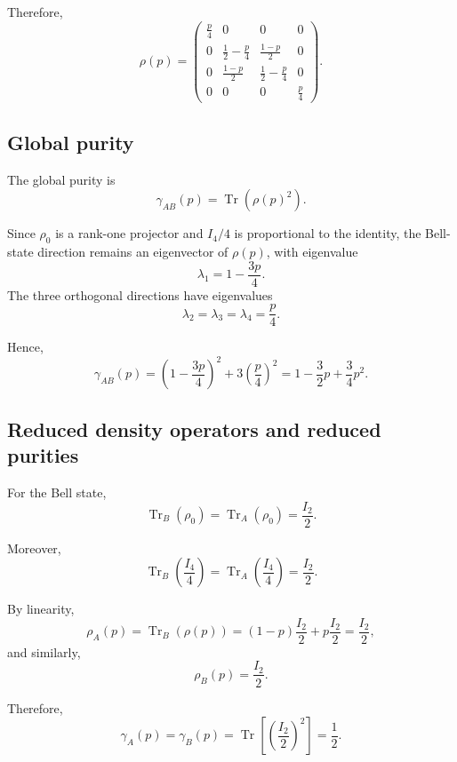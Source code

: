 \documentclass[a4paper]{article}
\begin{document}
Therefore,
\[
\rho(p)
=
\begin{pmatrix}
\frac{p}{4} & 0 & 0 & 0\\
0 & \frac12-\frac{p}{4} & \frac{1-p}{2} & 0\\
0 & \frac{1-p}{2} & \frac12-\frac{p}{4} & 0\\
0 & 0 & 0 & \frac{p}{4}
\end{pmatrix}.
\]


\subsection*{Global purity}

The global purity is
\[
\gamma_{AB}(p) = \operatorname{Tr}\!\left(\rho(p)^2\right).
\]

Since \( \rho_0 \) is a rank-one projector and \( I_4/4 \) is proportional to the identity, the Bell-state direction remains an eigenvector of \( \rho(p) \), with eigenvalue
\[
\lambda_1 = 1-\frac{3p}{4}.
\]
The three orthogonal directions have eigenvalues
\[
\lambda_2=\lambda_3=\lambda_4=\frac{p}{4}.
\]

Hence,
\[
\gamma_{AB}(p)
=
\left(1-\frac{3p}{4}\right)^2
+
3\left(\frac{p}{4}\right)^2
=
1-\frac{3}{2}p+\frac{3}{4}p^2.
\]


\subsection*{Reduced density operators and reduced purities}

For the Bell state,
\[
\operatorname{Tr}_B(\rho_0)
=
\operatorname{Tr}_A(\rho_0)
=
\frac{I_2}{2}.
\]

Moreover,
\[
\operatorname{Tr}_B\!\left(\frac{I_4}{4}\right)
=
\operatorname{Tr}_A\!\left(\frac{I_4}{4}\right)
=
\frac{I_2}{2}.
\]

By linearity,
\[
\rho_A(p)
=
\operatorname{Tr}_B(\rho(p))
=
(1-p)\frac{I_2}{2}
+
p\frac{I_2}{2}
=
\frac{I_2}{2},
\]
and similarly,
\[
\rho_B(p)=\frac{I_2}{2}.
\]

Therefore,
\[
\gamma_A(p)
=
\gamma_B(p)
=
\operatorname{Tr}\!\left[\left(\frac{I_2}{2}\right)^2\right]
=
\frac{1}{2}.
\]
\end{document}
